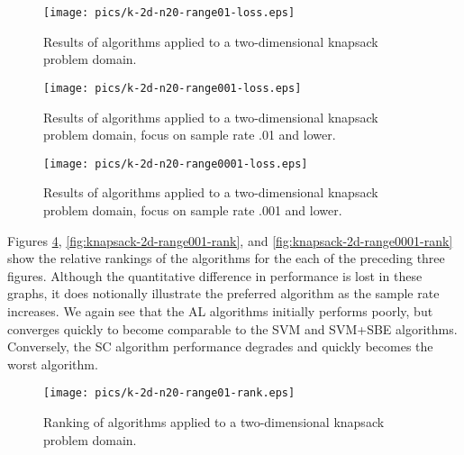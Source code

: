 \begin{figure}
\begin{center}
\texttt{[image: pics/k-2d-n20-range01-loss.eps]}
\caption{Results of algorithms applied to a two-dimensional knapsack problem domain.}
\label{fig:knapsack-2d-range01-loss}
\end{center}
\end{figure}

\begin{figure}
\begin{center}
\texttt{[image: pics/k-2d-n20-range001-loss.eps]}
\caption{Results of algorithms applied to a two-dimensional knapsack problem domain, focus on sample rate .01 and lower.}
\label{fig:knapsack-2d-range001-loss}
\end{center}
\end{figure}

\begin{figure}
\begin{center}
\texttt{[image: pics/k-2d-n20-range0001-loss.eps]}
\caption{Results of algorithms applied to a two-dimensional knapsack problem domain, focus on sample rate .001 and lower.}
\label{fig:knapsack-2d-range0001-loss}
\end{center}
\end{figure}

Figures \ref{fig:knapsack-2d-range01-rank}, \ref{fig:knapsack-2d-range001-rank}, and \ref{fig:knapsack-2d-range0001-rank} show the relative rankings of the algorithms for the each of the preceding three figures.  Although the quantitative difference in performance is lost in these graphs, it does notionally illustrate the preferred algorithm as the sample rate increases.  We again see that the AL algorithms initially performs poorly, but converges quickly to become comparable to the SVM and SVM+SBE algorithms.  Conversely, the SC algorithm performance degrades and quickly becomes the worst algorithm. 

\begin{figure}
\begin{center}
\texttt{[image: pics/k-2d-n20-range01-rank.eps]}
\caption{Ranking of algorithms applied to a two-dimensional knapsack problem domain.}
\label{fig:knapsack-2d-range01-rank}
\end{center}
\end{figure}


